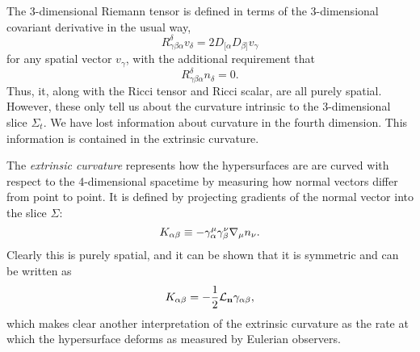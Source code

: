 The 3-dimensional Riemann tensor is defined in terms of the 3-dimensional covariant derivative in the usual way,
\begin{equation}
\label{eq:3Riemann}
R^{\delta}_{\gamma \beta \alpha} v_\delta = 2 D_{[\alpha} D_{\beta]} v_\gamma 
\end{equation}
for any spatial vector $v_\gamma$, with the additional requirement that 
\begin{equation}
R^{\delta}_{\gamma \beta \alpha}n_\delta =0.
\end{equation}
Thus, it, along with the Ricci tensor and Ricci scalar, are all purely spatial. However, these only tell us about the curvature intrinsic to the 3-dimensional slice $\Sigma_t$. We have lost information about curvature in the fourth dimension. This information is contained in the extrinsic curvature.

The \textit{extrinsic curvature} represents how the hypersurfaces are are curved with respect to the 4-dimensional spacetime by measuring how normal vectors differ from point to point.  It is defined by projecting gradients of the normal vector into the slice $\Sigma$:
\begin{equation}\label{eq:ExtCurve}
K_{\alpha \beta} \equiv -\gamma_{\alpha}^{\mu} \gamma_{\beta}^{\nu} {\nabla} _{\mu} n_{\nu}. 
\end{equation}
Clearly this is purely spatial, and it can be shown \cite{BaumgarteShapiro} that it is symmetric and can
be written as 
\begin{equation}
\label{eq:ExtCurve3}
K_{\alpha \beta}=-\frac{1}{2} {\mathcal{L}}_{\mathbf{n}} \gamma_{\alpha \beta},
\end{equation}
which makes clear another interpretation of the extrinsic curvature as the rate at which the hypersurface deforms as measured by Eulerian observers.

